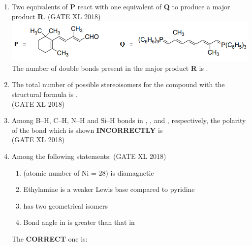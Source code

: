 \documentclass[14pt]{extarticle}
\begin{document}
\begin{flushleft}
\begin{enumerate}
\item Two equivalents of \textbf{P} react with one equivalent of \textbf{Q} to produce a major product \textbf{R}. \hfill (GATE XL 2018)\\
\includegraphics[scale=0.7]{fig2.png}\\
The number of double bonds present in the major product \textbf{R} is \underline{\hspace{3cm}}.

\item The total number of possible stereoisomers for the compound with the structural formula  is \underline{\hspace{3cm}}.\\
    \hfill (GATE XL 2018)\\

    \item Among B–H, C–H, N–H and Si–H bonds in , ,  and , respectively, the polarity of the bond which is shown \textbf{INCORRECTLY} is\\
    \hfill (GATE XL 2018)\\
    \begin{enumerate}[label=(\Alph*)]
    \end{enumerate}

\item Among the following statements: \hfill (GATE XL 2018)\\
\begin{enumerate}[label=(\roman*)]
\item {} (atomic number of Ni = 28) is diamagnetic
\item Ethylamine is a weaker Lewis base compared to pyridine
\item \ce{[NiCl2\{P(C6H5)3\}2]} has two geometrical isomers
\item Bond angle in  is greater than that in 
\end{enumerate}
The \textbf{CORRECT} one is:
\begin{enumerate}
\end{enumerate}


\end{enumerate}
\end{flushleft}
\end{document}
